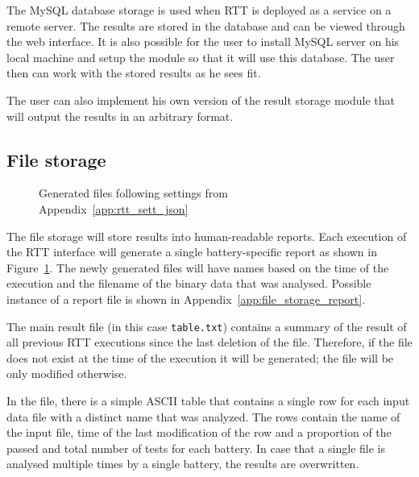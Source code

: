 \documentclass[
	digital,    %
	oneside,    %
	color,
	11pt,
	nocover,
	notable,
	nolof,
	nolot,
]{fithesis3}
\theoremstyle{definition}
\theoremstyle{remark}
\begin{document}
The MySQL database storage is used when RTT is deployed as a service on a remote server. The results are stored in the database and can be viewed through the web interface. It is also possible for the user to install MySQL server on his local machine and setup the module so that it will use this database. The user then can work with the stored results as he sees fit.

The user can also implement his own version of the result storage module that will output the results in an arbitrary format. 

\subsection{File storage}
\label{sec:file_res_storage}
\begin{figure}[h!]
\centering
{}
\caption{Generated files following settings from Appendix~\ref{app:rtt_sett_json}}
\label{fig:files_generated}
\end{figure}

\noindent
The file storage will store results into human-readable reports. Each execution of the RTT interface will generate a single battery-specific report as shown in Figure~\ref{fig:files_generated}. The newly generated files will have names based on the time of the execution and the filename of the binary data that was analysed. Possible instance of a report file is shown in Appendix~\ref{app:file_storage_report}.

The main result file (in this case \texttt{table.txt}) contains a summary of the result of all previous RTT executions since the last deletion of the file. Therefore, if the file does not exist at the time of the execution it will be generated; the file will be only modified otherwise.

In the file, there is a simple ASCII table that contains a single row for each input data file with a distinct name that was analyzed. The rows contain the name of the input file, time of the last modification of the row and a proportion of the passed and total number of tests for each battery. In case that a single file is analysed multiple times by a single battery, the results are overwritten.
\end{document}
